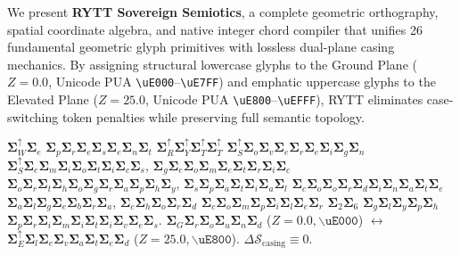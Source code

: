 \documentclass[10pt,oneside,letterpaper]{article}
\newcommand{\rosettaentry}[2]{%
  \begin{minipage}[t]{0.48\textwidth}
    \small\color{ink} #1
  \end{minipage}\hfill%
  \begin{minipage}[t]{0.48\textwidth}
    \small\ttfamily\color{cyan} #2
  \end{minipage}\par\vspace{0.4em}
}
\begin{document}
\rosettaentry{%
We present \textbf{RYTT Sovereign Semiotics}, a complete geometric orthography, spatial coordinate algebra, and native integer chord compiler that unifies 26 fundamental geometric glyph primitives with lossless dual-plane casing mechanics. By assigning structural lowercase glyphs to the Ground Plane ($Z=0.0$, Unicode PUA \texttt{\textbackslash uE000}--\texttt{\textbackslash uE7FF}) and emphatic uppercase glyphs to the Elevated Plane ($Z=25.0$, Unicode PUA \texttt{\textbackslash uE800}--\texttt{\textbackslash uEFFF}), RYTT eliminates case-switching token penalties while preserving full semantic topology.
}{%
$\mathbf{\Sigma}^\uparrow_W \mathbf{\Sigma}_e$ $\mathbf{\Sigma}_p \mathbf{\Sigma}_r \mathbf{\Sigma}_e \mathbf{\Sigma}_s \mathbf{\Sigma}_e \mathbf{\Sigma}_n \mathbf{\Sigma}_t$ $\mathbf{\Sigma}^\uparrow_R \mathbf{\Sigma}^\uparrow_Y \mathbf{\Sigma}^\uparrow_T \mathbf{\Sigma}^\uparrow_T$ $\mathbf{\Sigma}^\uparrow_S \mathbf{\Sigma}_o \mathbf{\Sigma}_v \mathbf{\Sigma}_e \mathbf{\Sigma}_r \mathbf{\Sigma}_e \mathbf{\Sigma}_i \mathbf{\Sigma}_g \mathbf{\Sigma}_n$ $\mathbf{\Sigma}^\uparrow_S \mathbf{\Sigma}_e \mathbf{\Sigma}_m \mathbf{\Sigma}_i \mathbf{\Sigma}_o \mathbf{\Sigma}_t \mathbf{\Sigma}_i \mathbf{\Sigma}_c \mathbf{\Sigma}_s$, $\mathbf{\Sigma}_g \mathbf{\Sigma}_e \mathbf{\Sigma}_o \mathbf{\Sigma}_m \mathbf{\Sigma}_e \mathbf{\Sigma}_t \mathbf{\Sigma}_r \mathbf{\Sigma}_i \mathbf{\Sigma}_c$ $\mathbf{\Sigma}_o \mathbf{\Sigma}_r \mathbf{\Sigma}_t \mathbf{\Sigma}_h \mathbf{\Sigma}_o \mathbf{\Sigma}_g \mathbf{\Sigma}_r \mathbf{\Sigma}_a \mathbf{\Sigma}_p \mathbf{\Sigma}_h \mathbf{\Sigma}_y$, $\mathbf{\Sigma}_s \mathbf{\Sigma}_p \mathbf{\Sigma}_a \mathbf{\Sigma}_t \mathbf{\Sigma}_i \mathbf{\Sigma}_a \mathbf{\Sigma}_l$ $\mathbf{\Sigma}_c \mathbf{\Sigma}_o \mathbf{\Sigma}_o \mathbf{\Sigma}_r \mathbf{\Sigma}_d \mathbf{\Sigma}_i \mathbf{\Sigma}_n \mathbf{\Sigma}_a \mathbf{\Sigma}_t \mathbf{\Sigma}_e$ $\mathbf{\Sigma}_a \mathbf{\Sigma}_l \mathbf{\Sigma}_g \mathbf{\Sigma}_e \mathbf{\Sigma}_b \mathbf{\Sigma}_r \mathbf{\Sigma}_a$, $\mathbf{\Sigma}_c \mathbf{\Sigma}_h \mathbf{\Sigma}_o \mathbf{\Sigma}_r \mathbf{\Sigma}_d$ $\mathbf{\Sigma}_c \mathbf{\Sigma}_o \mathbf{\Sigma}_m \mathbf{\Sigma}_p \mathbf{\Sigma}_i \mathbf{\Sigma}_l \mathbf{\Sigma}_e \mathbf{\Sigma}_r$ $\mathbf{\Sigma}_2 \mathbf{\Sigma}_6$ $\mathbf{\Sigma}_g \mathbf{\Sigma}_l \mathbf{\Sigma}_y \mathbf{\Sigma}_p \mathbf{\Sigma}_h$ $\mathbf{\Sigma}_p \mathbf{\Sigma}_r \mathbf{\Sigma}_i \mathbf{\Sigma}_m \mathbf{\Sigma}_i \mathbf{\Sigma}_t \mathbf{\Sigma}_i \mathbf{\Sigma}_v \mathbf{\Sigma}_e \mathbf{\Sigma}_s$. $\mathbf{\Sigma}_G \mathbf{\Sigma}_r \mathbf{\Sigma}_o \mathbf{\Sigma}_u \mathbf{\Sigma}_n \mathbf{\Sigma}_d$ ($Z=0.0, \mathtt{\backslash uE000}$) $\longleftrightarrow$ $\mathbf{\Sigma}^\uparrow_E \mathbf{\Sigma}_l \mathbf{\Sigma}_e \mathbf{\Sigma}_v \mathbf{\Sigma}_a \mathbf{\Sigma}_t \mathbf{\Sigma}_e \mathbf{\Sigma}_d$ ($Z=25.0, \mathtt{\backslash uE800}$). $\Delta \mathcal{S}_{\text{casing}} \equiv 0$.
}
\end{document}
